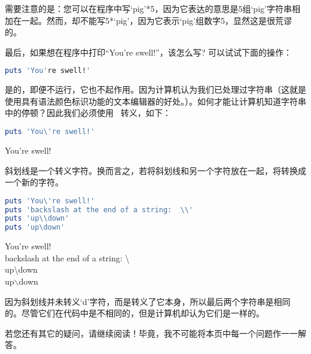 需要注意的是：您可以在程序中写`pig'*5，因为它表达的意思是5组`pig'字符串相加在一起。然而，却不能写5*`pig'，因为它表示`pig'组数字5，显然这是很荒谬的。

最后，如果想在程序中打印“You're swell!”，该怎么写? 可以试试下面的操作：
\begin{lstlisting}[language=ruby]
puts 'You're swell!'
\end{lstlisting}

是的，即便不运行，它也不起作用。因为计算机认为我们已处理过字符串（这就是使用具有语法颜色标识功能的文本编辑器的好处。）。如何才能让计算机知道字符串中的停顿？因此我们必须使用 \ 转义，如下：
\begin{lstlisting}[language=ruby]
puts 'You\'re swell!'
\end{lstlisting}
You're swell!

斜划线是一个转义字符。换而言之，若将斜划线和另一个字符放在一起，将转换成一个新的字符。
\begin{lstlisting}[language=ruby]
puts 'You\'re swell!'
puts 'backslash at the end of a string:  \\'
puts 'up\\down'
puts 'up\down'
\end{lstlisting}
You're swell!\\
backslash at the end of a string:  \textbackslash \\
up\textbackslash{down} \\
up$\backslash$down

因为斜划线并未转义`d'字符，而是转义了它本身，所以最后两个字符串是相同的。尽管它们在代码中是不相同的，但是计算机却认为它们是一样的。

若您还有其它的疑问，请继续阅读！毕竟，我不可能将本页中每一个问题作一一解答。

